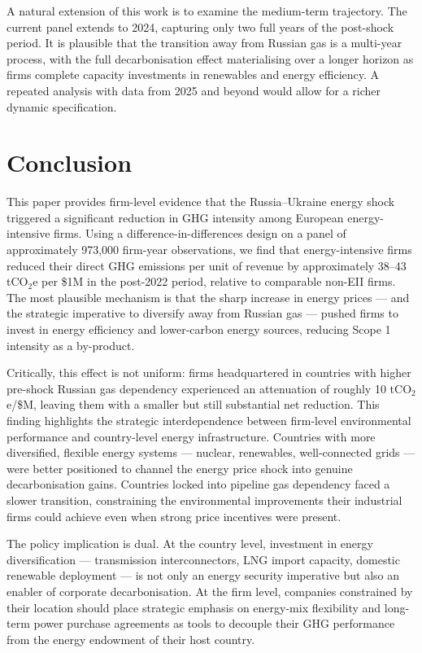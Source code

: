 \documentclass[12pt,a4paper]{article}
\begin{document}
A natural extension of this work is to examine the medium-term trajectory. The current panel extends to 2024, capturing only two full years of the post-shock period. It is plausible that the transition away from Russian gas is a multi-year process, with the full decarbonisation effect materialising over a longer horizon as firms complete capacity investments in renewables and energy efficiency. A repeated analysis with data from 2025 and beyond would allow for a richer dynamic specification.

\section{Conclusion}
\label{sec:conclusion}

This paper provides firm-level evidence that the Russia–Ukraine energy shock triggered a significant reduction in GHG intensity among European energy-intensive firms. Using a difference-in-differences design on a panel of approximately 973,000 firm-year observations, we find that energy-intensive firms reduced their direct GHG emissions per unit of revenue by approximately 38--43 tCO$_2$e per \$1M in the post-2022 period, relative to comparable non-EII firms. The most plausible mechanism is that the sharp increase in energy prices — and the strategic imperative to diversify away from Russian gas — pushed firms to invest in energy efficiency and lower-carbon energy sources, reducing Scope 1 intensity as a by-product.

Critically, this effect is not uniform: firms headquartered in countries with higher pre-shock Russian gas dependency experienced an attenuation of roughly 10 tCO$_2$e/\$M, leaving them with a smaller but still substantial net reduction. This finding highlights the strategic interdependence between firm-level environmental performance and country-level energy infrastructure. Countries with more diversified, flexible energy systems — nuclear, renewables, well-connected grids — were better positioned to channel the energy price shock into genuine decarbonisation gains. Countries locked into pipeline gas dependency faced a slower transition, constraining the environmental improvements their industrial firms could achieve even when strong price incentives were present.

The policy implication is dual. At the country level, investment in energy diversification — transmission interconnectors, LNG import capacity, domestic renewable deployment — is not only an energy security imperative but also an enabler of corporate decarbonisation. At the firm level, companies constrained by their location should place strategic emphasis on energy-mix flexibility and long-term power purchase agreements as tools to decouple their GHG performance from the energy endowment of their host country.
\end{document}
